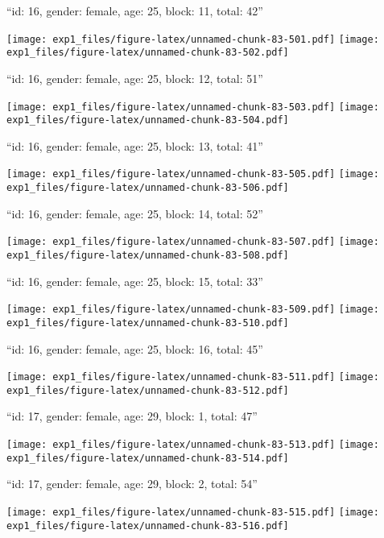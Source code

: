 \documentclass[11pt,,]{article}
\begin{document}
\newpage
[1] 

``id: 16, gender: female, age: 25, block: 11, total: 42''

\texttt{[image: exp1\_files/figure-latex/unnamed-chunk-83-501.pdf]}
\texttt{[image: exp1\_files/figure-latex/unnamed-chunk-83-502.pdf]}

\newpage
[1] 

``id: 16, gender: female, age: 25, block: 12, total: 51''

\texttt{[image: exp1\_files/figure-latex/unnamed-chunk-83-503.pdf]}
\texttt{[image: exp1\_files/figure-latex/unnamed-chunk-83-504.pdf]}

\newpage
[1] 

``id: 16, gender: female, age: 25, block: 13, total: 41''

\texttt{[image: exp1\_files/figure-latex/unnamed-chunk-83-505.pdf]}
\texttt{[image: exp1\_files/figure-latex/unnamed-chunk-83-506.pdf]}

\newpage
[1] 

``id: 16, gender: female, age: 25, block: 14, total: 52''

\texttt{[image: exp1\_files/figure-latex/unnamed-chunk-83-507.pdf]}
\texttt{[image: exp1\_files/figure-latex/unnamed-chunk-83-508.pdf]}

\newpage
[1] 

``id: 16, gender: female, age: 25, block: 15, total: 33''

\texttt{[image: exp1\_files/figure-latex/unnamed-chunk-83-509.pdf]}
\texttt{[image: exp1\_files/figure-latex/unnamed-chunk-83-510.pdf]}

\newpage
[1] 

``id: 16, gender: female, age: 25, block: 16, total: 45''

\texttt{[image: exp1\_files/figure-latex/unnamed-chunk-83-511.pdf]}
\texttt{[image: exp1\_files/figure-latex/unnamed-chunk-83-512.pdf]}

\newpage
[1] 

``id: 17, gender: female, age: 29, block: 1, total: 47''

\texttt{[image: exp1\_files/figure-latex/unnamed-chunk-83-513.pdf]}
\texttt{[image: exp1\_files/figure-latex/unnamed-chunk-83-514.pdf]}

\newpage
[1] 

``id: 17, gender: female, age: 29, block: 2, total: 54''

\texttt{[image: exp1\_files/figure-latex/unnamed-chunk-83-515.pdf]}
\texttt{[image: exp1\_files/figure-latex/unnamed-chunk-83-516.pdf]}
\end{document}
